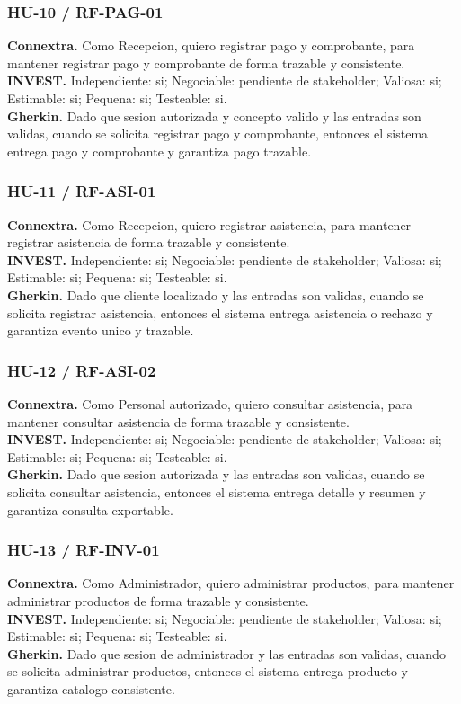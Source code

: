 \documentclass[11pt,a4paper,twoside]{article}
\begin{document}
\subsubsection{HU-10 / RF-PAG-01}
\textbf{Connextra.} Como Recepcion, quiero registrar pago y comprobante, para mantener registrar pago y comprobante de forma trazable y consistente.\\
\textbf{INVEST.} Independiente: si; Negociable: pendiente de stakeholder; Valiosa: si; Estimable: si; Pequena: si; Testeable: si.\\
\textbf{Gherkin.} Dado que sesion autorizada y concepto valido y las entradas son validas, cuando se solicita registrar pago y comprobante, entonces el sistema entrega pago y comprobante y garantiza pago trazable.

\subsubsection{HU-11 / RF-ASI-01}
\textbf{Connextra.} Como Recepcion, quiero registrar asistencia, para mantener registrar asistencia de forma trazable y consistente.\\
\textbf{INVEST.} Independiente: si; Negociable: pendiente de stakeholder; Valiosa: si; Estimable: si; Pequena: si; Testeable: si.\\
\textbf{Gherkin.} Dado que cliente localizado y las entradas son validas, cuando se solicita registrar asistencia, entonces el sistema entrega asistencia o rechazo y garantiza evento unico y trazable.

\subsubsection{HU-12 / RF-ASI-02}
\textbf{Connextra.} Como Personal autorizado, quiero consultar asistencia, para mantener consultar asistencia de forma trazable y consistente.\\
\textbf{INVEST.} Independiente: si; Negociable: pendiente de stakeholder; Valiosa: si; Estimable: si; Pequena: si; Testeable: si.\\
\textbf{Gherkin.} Dado que sesion autorizada y las entradas son validas, cuando se solicita consultar asistencia, entonces el sistema entrega detalle y resumen y garantiza consulta exportable.

\subsubsection{HU-13 / RF-INV-01}
\textbf{Connextra.} Como Administrador, quiero administrar productos, para mantener administrar productos de forma trazable y consistente.\\
\textbf{INVEST.} Independiente: si; Negociable: pendiente de stakeholder; Valiosa: si; Estimable: si; Pequena: si; Testeable: si.\\
\textbf{Gherkin.} Dado que sesion de administrador y las entradas son validas, cuando se solicita administrar productos, entonces el sistema entrega producto y garantiza catalogo consistente.
\end{document}
